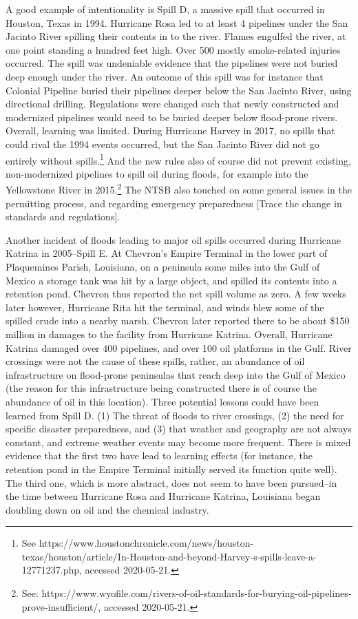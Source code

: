 \documentclass[12pt, man, natbib]{apa6}
\begin{document}
	A good example of intentionality is Spill D, a massive spill that occurred in Houston, Texas in 1994. Hurricane Rosa led to at least 4 pipelines under the San Jacinto River spilling their contents in to the river. Flames engulfed the river, at one point standing a hundred feet high. Over 500 mostly smoke-related injuries occurred. The spill was undeniable evidence that the pipelines were not buried deep enough under the river. An outcome of this spill was for instance that Colonial Pipeline buried their pipelines deeper below the San Jacinto River, using directional drilling. Regulations were changed such that newly constructed and modernized pipelines would need to be buried deeper below flood-prone rivers. Overall, learning was limited. During Hurricane Harvey in 2017, no spills that could rival the 1994 events occurred, but the San Jacinto River did not go entirely without spills.\footnote{See https://www.houstonchronicle.com/news/houston-texas/houston/article/In-Houston-and-beyond-Harvey-s-spills-leave-a-12771237.php, accessed 2020-05-21.} And the new rules also of course did not prevent existing, non-modernized pipelines to spill oil during floods, for example into the Yellowstone River in 2015.\footnote{See: https://www.wyofile.com/rivers-of-oil-standards-for-burying-oil-pipelines-prove-insufficient/, accessed 2020-05-21.} The NTSB also touched on some general issues in the permitting process, and regarding emergency preparedness [Trace the change in standards and regulations].
	
	Another incident of floods leading to major oil spills occurred during Hurricane Katrina in 2005--Spill E. At Chevron's Empire Terminal in the lower part of Plaquemines Parish, Louisiana, on a peninsula some miles into the Gulf of Mexico a storage tank was hit by a large object, and spilled its contents into a retention pond. Chevron thus reported the net spill volume as zero. A few weeks later however, Hurricane Rita hit the terminal, and winds blew some of the spilled crude into a nearby marsh. Chevron later reported there to be about \$150 million in damages to the facility from Hurricane Katrina. Overall, Hurricane Katrina damaged over 400 pipelines, and over 100 oil platforms in the Gulf. River crossings were not the cause of these spills, rather, an abundance of oil infrastructure on flood-prone peninsulas that reach deep into the Gulf of Mexico (the reason for this infrastructure being constructed there is of course the abundance of oil in this location). Three potential lessons could have been learned from Spill D. (1) The threat of floods to river crossings, (2) the need for specific disaster preparedness, and (3) that weather and geography are not always constant, and extreme weather events may become more frequent. There is mixed evidence that the first two have lead to learning effects (for instance, the retention pond in the Empire Terminal initially served its function quite well). The third one, which is more abstract, does not seem to have been pursued--in the time between Hurricane Rosa and Hurricane Katrina, Louisiana began doubling down on oil and the chemical industry. 


\end{document}
